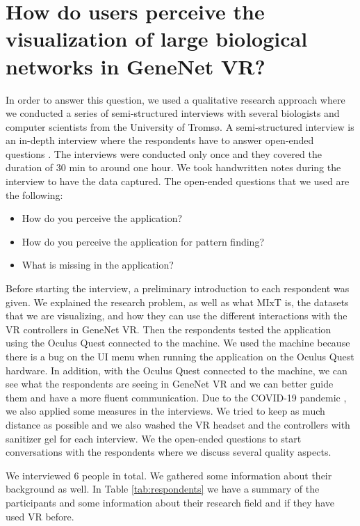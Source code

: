 \section{How do users perceive the visualization of large biological networks in GeneNet VR?}
In order to answer this question, we used a qualitative research approach where we conducted a series of semi-structured interviews with several biologists and computer scientists from the University of Troms\o. A semi-structured interview is an in-depth interview where the respondents have to answer open-ended questions \cite{interviews}. The interviews were conducted only once and they covered the duration of 30 min to around one hour. We took handwritten notes during the interview to have the data captured. The open-ended questions that we used are the following:
\begin{itemize}
  \item How do you perceive the application?
  \item How do you perceive the application for pattern finding?
  \item What is missing in the application?
\end{itemize}

Before starting the interview, a preliminary introduction to each respondent was given. We explained the research problem, as well as what MIxT is, the datasets that we are visualizing, and how they can use the different interactions with the VR controllers in GeneNet VR. Then the respondents tested the application using the Oculus Quest connected to the machine. We used the machine because there is a bug on the UI menu when running the application on the Oculus Quest hardware. In addition, with the Oculus Quest connected to the machine, we can see what the respondents are seeing in GeneNet VR and we can better guide them and have a more fluent communication. Due to the COVID-19 pandemic \cite{covid_19}, we also applied some measures in the interviews. We tried to keep as much distance as possible and we also washed the VR headset and the controllers with sanitizer gel for each interview. We the open-ended questions to start conversations with the respondents where we discuss several quality aspects.

We interviewed 6 people in total. We gathered some information about their background as well. In Table  \ref{tab:respondents} we have a summary of the participants and some information about their research field and if they have used VR before.

